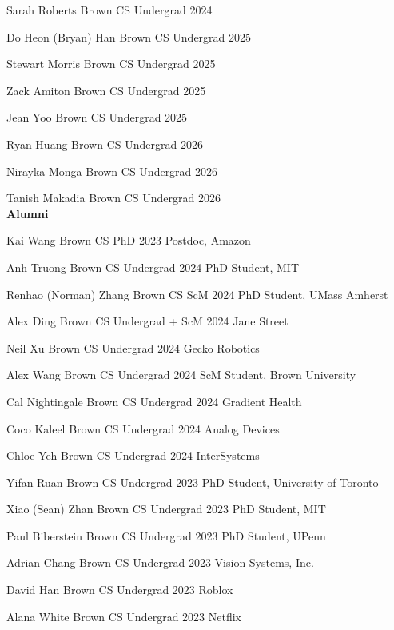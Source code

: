 \documentclass[line,margin]{res}
\begin{document}
\begin{resume}
\student
{Sarah Roberts}
{Brown CS Undergrad}
{2024}

\student
{Do Heon (Bryan) Han}
{Brown CS Undergrad}
{2025}

\student
{Stewart Morris}
{Brown CS Undergrad}
{2025}

\student
{Zack Amiton}
{Brown CS Undergrad}
{2025}

\student
{Jean Yoo}
{Brown CS Undergrad}
{2025}

\student
{Ryan Huang}
{Brown CS Undergrad}
{2026}

\student
{Nirayka Monga}
{Brown CS Undergrad}
{2026}

\student
{Tanish Makadia}
{Brown CS Undergrad}
{2026}
\\


\textbf{Alumni}

\alumni
{Kai Wang}
{Brown CS PhD}
{2023}
{Postdoc, Amazon}

\alumni
{Anh Truong}
{Brown CS Undergrad}
{2024}
{PhD Student, MIT}

\alumni
{Renhao (Norman) Zhang}
{Brown CS ScM}
{2024}
{PhD Student, UMass Amherst}


\alumni
{Alex Ding}
{Brown CS Undergrad + ScM}
{2024}
{Jane Street}

\alumni
{Neil Xu}
{Brown CS Undergrad}
{2024}
{Gecko Robotics}

\alumni
{Alex Wang}
{Brown CS Undergrad}
{2024}
{ScM Student, Brown University}

\alumni
{Cal Nightingale}
{Brown CS Undergrad}
{2024}
{Gradient Health}

\alumni
{Coco Kaleel}
{Brown CS Undergrad}
{2024}
{Analog Devices}

\alumni
{Chloe Yeh}
{Brown CS Undergrad}
{2024}
{InterSystems}

\alumni
{Yifan Ruan}
{Brown CS Undergrad}
{2023}
{PhD Student, University of Toronto}

\alumni
{Xiao (Sean) Zhan}
{Brown CS Undergrad}
{2023}
{PhD Student, MIT}

\alumni
{Paul Biberstein}
{Brown CS Undergrad}
{2023}
{PhD Student, UPenn}

\alumni
{Adrian Chang}
{Brown CS Undergrad}
{2023}
{Vision Systems, Inc.}

\alumni
{David Han}
{Brown CS Undergrad}
{2023}
{Roblox}

\alumni
{Alana White}
{Brown CS Undergrad}
{2023}
{Netflix}


\end{resume}
\end{document}
